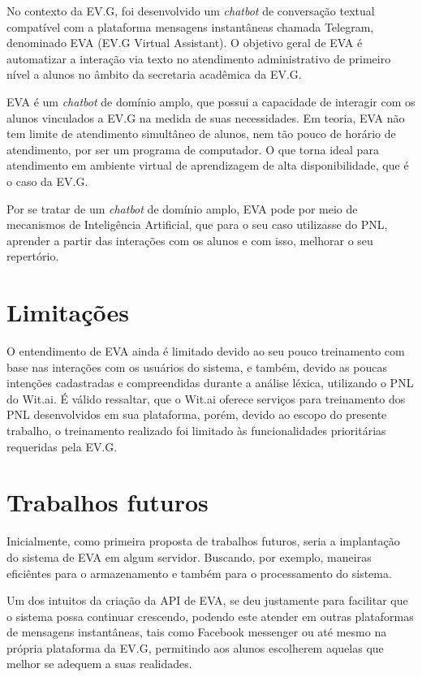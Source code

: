 No contexto da EV.G, foi desenvolvido um \textit{chatbot} de conversação textual compatível com a plataforma mensagens instantâneas chamada Telegram, denominado EVA (EV.G Virtual Assistant). O objetivo geral de EVA é automatizar a interação via texto no atendimento administrativo de primeiro nível a alunos no âmbito da secretaria acadêmica da EV.G.

EVA é um \textit{chatbot} de domínio amplo, que possui a capacidade de interagir com os alunos vinculados a EV.G na medida de suas necessidades. Em teoria, EVA não tem limite de atendimento simultâneo de alunos, nem tão pouco de horário de atendimento, por ser um programa de computador. O que torna ideal para atendimento em ambiente virtual de aprendizagem de alta disponibilidade, que é o caso da EV.G.

Por se tratar de um \textit{chatbot} de domínio amplo, EVA pode por meio de mecanismos de Inteligência Artificial, que para o seu caso utilizasse do PNL, aprender a partir das interações com os alunos e com isso, melhorar o seu repertório.



\section{Limitações}

O entendimento de EVA ainda é limitado devido ao seu pouco treinamento com base nas interações com os usuários do sistema, e também, devido as poucas intenções cadastradas e compreendidas durante a análise léxica, utilizando o PNL do Wit.ai. É válido ressaltar, que o Wit.ai oferece serviços para treinamento dos PNL desenvolvidos em sua plataforma, porém, devido ao escopo do presente trabalho, o treinamento realizado foi limitado às funcionalidades prioritárias requeridas pela EV.G.



\section{Trabalhos futuros}

Inicialmente, como primeira proposta de trabalhos futuros, seria a implantação do sistema de EVA em algum servidor. Buscando, por exemplo, maneiras eficiêntes para o armazenamento e também para o processamento do sistema.

Um dos intuitos da criação da API de EVA, se deu justamente para facilitar que o sistema possa continuar crescendo, podendo este atender em outras plataformas de mensagens instantâneas, tais como Facebook messenger ou até mesmo na própria plataforma da EV.G, permitindo aos alunos escolherem aquelas que melhor se adequem a suas realidades.


